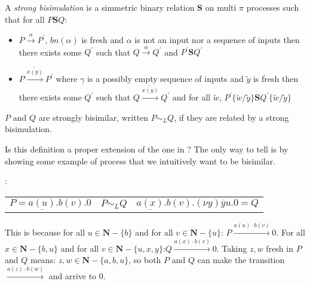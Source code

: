 \begin{definition}\label{strongLateBisimulation}
  A \emph{strong bisimulation} is a simmetric binary relation $\mathbf{S}$ on multi $\pi$ processes such that for all $P\mathbf{S}Q$:
   \begin{itemize}
     \item 
       $P \xrightarrow{\alpha} P^{'}$, $bn(\alpha)$ is fresh and $\alpha$ is not an input nor a sequence of inputs then there exists some $Q^{'}$ such that $Q \xrightarrow{\alpha} Q^{'}$ and $P^{'}\mathbf{S}Q^{'}$
     \item
       $P \xrightarrow{\widetilde{x(y)}} P^{'}$ where $\gamma$ is a possibly empty sequence of inputs and $\tilde{y}$ is fresh then there exists some $Q^{'}$ such that $Q \xrightarrow{\widetilde{x(y)}} Q^{'}$ and for all $\tilde{w}$, $P^{'}\{\tilde{w}/\tilde{y}\}\mathbf{S}Q^{'}\{\tilde{w}/\tilde{y}\}$
  \end{itemize}
  $P$ and $Q$ are strongly bisimilar, written $P \sim_{L} Q$, if they are related by a strong bisimulation.
\end{definition}


Is this definition a proper extension of the one in \cite{parrow}? The only way to tell is by showing some example of process that we intuitively want to be bisimilar.
\begin{example}:
  \begin{center}
    \begin{tabular}{lll}
	$P=\underline{a(u)}.b(v).0$
      &
	$P \sim_{L} Q$ 
      &
	$\underline{a(x)}.b(v).(\nu y)\overline{y}u.0=Q$
    \end{tabular}
  \end{center}
  This is because for all $u\in \mathbf{N}-\{b\}$ and for all $v\in \mathbf{N}-\{u\}$: $P \xrightarrow{a(u) \cdot b(v)} 0$. For all $x\in \mathbf{N}-\{b,u\}$ and for all $v\in \mathbf{N}-\{u,x,y\}$:$Q \xrightarrow{a(x) \cdot b(v)} 0$. Taking $z,w$ fresh in $P$ and $Q$ means: $z,w\in \mathbf{N}-\{a,b,u\}$, so both $P$ and $Q$ can make the transition $\xrightarrow{a(z) \cdot b(w)}$ and arrive to $0$.
\end{example}

